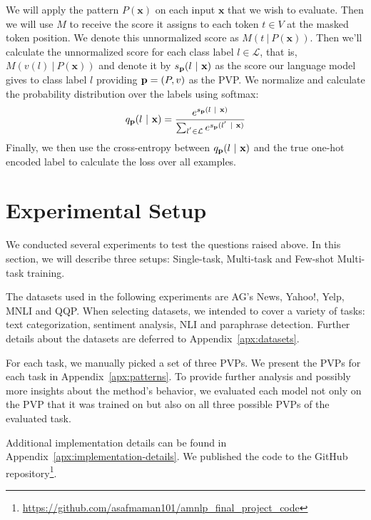 \documentclass[11pt,a4paper]{article}
\begin{document}
We will apply the pattern $P(\textbf{x})$ on each input $\textbf{x}$ that we wish to evaluate.
Then we will use $M$ to receive the score it assigns to each token $t\in{}V$ at the masked token position.
We denote this unnormalized score as $M(t\ |\ P(\textbf{x}))$.
Then we'll calculate the unnormalized score for each class label $l\in{}\mathcal{L}$, that is, $M(v(l)\ |\ P(\textbf{x}))$ and denote it by $s_{\text{\textbf{p}}}(l\ |\ \textbf{x})$ as the score our language model gives to class label $l$ providing $\text{\textbf{p}}=(P, v)$ as the PVP.
We normalize and calculate the probability distribution over the labels using softmax:
\[
	q_\text{\textbf{p}}(l\ |\ \textbf{x}) = \frac{e^{s_{\text{\textbf{p}}}(l\ |\ \textbf{x})}}{\sum_{l^{'}\in{}\mathcal{L}}e^{s_{\text{\textbf{p}}}(l^{'}\ |\ \textbf{x})}}
\]
Finally, we then use the cross-entropy between $q_\text{\textbf{p}}(l\ |\ \textbf{x})$ and the true one-hot encoded label to calculate the loss over all examples. 

\section{Experimental Setup}
\label{sec:experiments}



We conducted several experiments to test the questions raised above.
In this section, we will describe three setups: Single-task, Multi-task and Few-shot Multi-task training.

The datasets used in the following experiments are AG's News, Yahoo!, Yelp, MNLI and QQP.
When selecting datasets, we intended to cover a variety of tasks: text categorization, sentiment analysis, NLI and paraphrase detection.
Further details about the datasets are deferred to Appendix~\ref{apx:datasets}.

For each task, we manually picked a set of three PVPs.
We present the PVPs for each task in Appendix~\ref{apx:patterns}.
To provide further analysis and possibly more insights about the method's behavior, we evaluated each model not only on the PVP that it was trained on but also on all three possible PVPs of the evaluated task.

Additional implementation details can be found in Appendix~\ref{apx:implementation-details}.
We published the code to the GitHub repository\footnote{\url{https://github.com/asafmaman101/amnlp_final_project_code}}.
\end{document}

